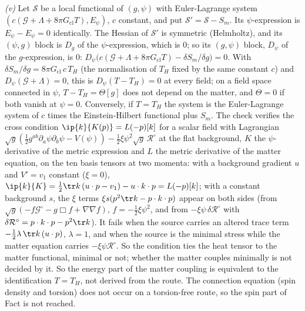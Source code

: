 \emph{(v)} Let $\mathcal{S}$ be a local functional of $(g, \psi)$ with Euler-Lagrange system $(c(\mathcal{G} + \Lambda + 8\pi G_{\mathrm{cl}}T), E_{\psi})$, $c$ constant, and put $\mathcal{S}' = \mathcal{S} - S_{m}$. Its $\psi$-expression is $E_{\psi} - E_{\psi} = 0$ identically. The Hessian of $\mathcal{S}'$ is symmetric (Helmholtz), and its $(\psi, g)$ block is $D_{g}$ of the $\psi$-expression, which is $0$; so its $(g, \psi)$ block, $D_{\psi}$ of the $g$-expression, is $0$: $D_{\psi}\big(c(\mathcal{G} + \Lambda + 8\pi G_{\mathrm{cl}}T) - \delta S_{m}/\delta g\big) = 0$. With $\delta S_{m}/\delta g = 8\pi G_{\mathrm{cl}}\,c\,T_{H}$ (the normalisation of $T_{H}$ fixed by the same constant $c$) and $D_{\psi}(\mathcal{G} + \Lambda) = 0$, this is $D_{\psi}(T - T_{H}) = 0$ at every field; on a field space connected in $\psi$, $T - T_{H} = \Theta[g]$ does not depend on the matter, and $\Theta = 0$ if both vanish at $\psi = 0$. Conversely, if $T = T_{H}$ the system is the Euler-Lagrange system of $c$ times the Einstein-Hilbert functional plus $S_{m}$. The check verifies the cross condition $\ip{k}{K(p)} = L(-p)[k]$ for a scalar field with Lagrangian $\sqrt{g}(\tfrac12 g^{ab}\partial_{a}\psi\partial_{b}\psi - V(\psi)) - \tfrac12\xi\psi^{2}\sqrt{g}\,\mathcal{R}^{\circ}$ at the flat background, $K$ the $\psi$-derivative of the metric expression and $L$ the metric derivative of the matter equation, on the ten basis tensors at two momenta: with a background gradient $u$ and $V' = v_{1}$ constant ($\xi = 0$), $\ip{k}{K} = \tfrac12\tr k\,(u\cdot p - v_{1}) - u\cdot k\cdot p = L(-p)[k]$; with a constant background $s$, the $\xi$ terms $\xi s(p^{2}\tr k - p\cdot k\cdot p)$ appear on both sides (from $\sqrt{g}(-f\mathcal{G}^{\circ} - g\Box f + \nabla\nabla f)$, $f = -\tfrac12\xi\psi^{2}$, and from $-\xi\psi\,\delta\mathcal{R}^{\circ}$ with $\delta\mathcal{R}^{\circ} = p\cdot k\cdot p - p^{2}\tr k$). It fails when the source carries an altered trace term $-\tfrac12\lambda\,\tr k\,(u\cdot p)$, $\lambda = 1$, and when the source is the minimal stress while the matter equation carries $-\xi\psi\mathcal{R}^{\circ}$. So the condition ties the heat tensor to the matter functional, minimal or not; whether the matter couples minimally is not decided by it. So the energy part of the matter coupling is equivalent to the identification $T = T_{H}$, not derived from the route. The connection equation (spin density and torsion) does not occur on a torsion-free route, so the spin part of Fact  is not reached.

